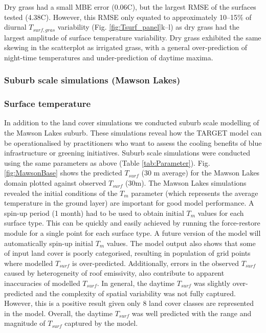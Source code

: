 \documentclass[gmd, manuscript]{copernicus}
\begin{document}
Dry grass had a small MBE error (0.06\degree C), but the largest RMSE of the surfaces tested (4.38\degree C). However, this RMSE only equated to approximately 10--15\% of diurnal $T_{surf,gras}$ variability (Fig. \ref{fig:Tsurf_panel}k--l) as dry grass had the largest amplitude of surface temperature variability. Dry grass exhibited the same skewing in the scatterplot as irrigated grass, with a general over-prediction of night-time temperatures and under-prediction of daytime maxima. 





\subsubsection{Suburb scale simulations (Mawson Lakes)}\label{sec:suburbresult} 
\subsubsection*{Surface temperature}\label{sec:surftempresult} 



In addition to the land cover simulations we conducted suburb scale modelling of the Mawson Lakes suburb. These simulations reveal how the TARGET model can be operationalised by practitioners who want to assess the cooling benefits of blue infrastructure or greening initiatives. Suburb scale simulations were conducted using the same parameters as above (Table \ref{tab:Parameter}). Fig. \ref{fig:MawsonBase} shows the predicted $T_{surf}$ (30 m average) for the Mawson Lakes domain plotted against observed $T_{surf}$ (30m). The Mawson Lakes simulations revealed the initial conditions of the \ensuremath{T_{m}} parameter (which represents the average temperature in the ground layer) are  important for good model performance. A spin-up period (1 month) had to be used to obtain initial \ensuremath{T_{m}} values for each surface type. This can be quickly and easily achieved by running the force-restore module for a single point for each surface type. A future version of the model will automatically spin-up initial \ensuremath{T_{m}} values. The model output also shows that some of input land cover is poorly categorised, resulting in population of grid points where modelled $T_{surf}$ is  over-predicted. Additionally, errors in the observed $T_{surf}$ caused by heterogeneity of roof emissivity,  also contribute to apparent inaccuracies of modelled $T_{surf}$. In general, the daytime $T_{surf}$ was slightly over-predicted and the complexity of spatial variability was not fully captured. However, this is a positive result given only 8 land cover classes are represented in the model. Overall, the daytime $T_{surf}$ was well predicted with the range and magnitude of $T_{surf}$ captured by the model. 
\end{document}
